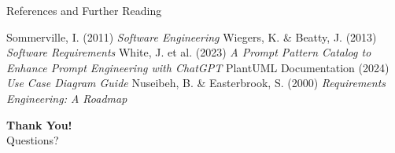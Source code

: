 \documentclass{beamer}
\begin{document}
\begin{frame}{References and Further Reading}
    \begin{thebibliography}{10}
         Sommerville, I. (2011) \emph{Software Engineering}
         Wiegers, K. \& Beatty, J. (2013) \emph{Software Requirements}
         White, J. et al. (2023) \emph{A Prompt Pattern Catalog to Enhance Prompt Engineering with ChatGPT}
         PlantUML Documentation (2024) \emph{Use Case Diagram Guide}
         Nuseibeh, B. \& Easterbrook, S. (2000) \emph{Requirements Engineering: A Roadmap}
    \end{thebibliography}
    
    \begin{center}
        \textbf{Thank You!}\\
        Questions?
    \end{center}
\end{frame}
\end{document}
